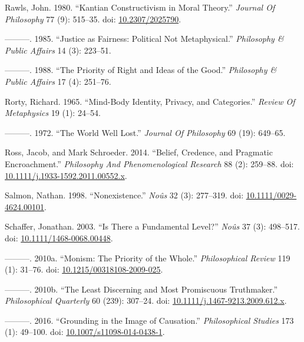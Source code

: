 \documentclass[
  10pt,
  letterpaper,
  DIV=11,
  numbers=noendperiod,
  twoside]{scrartcl}
\newlength{\cslhangindent}
\newenvironment{CSLReferences}[2] %
 {\begin{list}{}{%
  \setlength{\itemindent}{0pt}
  \setlength{\leftmargin}{0pt}
  \setlength{\parsep}{0pt}
  \ifodd #1
   \setlength{\leftmargin}{\cslhangindent}
   \setlength{\itemindent}{-1\cslhangindent}
  \fi
  \setlength{\itemsep}{#2\baselineskip}}}
 {\end{list}}
\begin{document}
\begin{CSLReferences}{1}{0}
Rawls, John. 1980. {``Kantian Constructivism in Moral Theory.''}
\emph{Journal Of Philosophy} 77 (9): 515--35. doi:
\href{https://doi.org/10.2307/2025790}{10.2307/2025790}.

---------. 1985. {``Justice as Fairness: Political Not Metaphysical.''}
\emph{Philosophy \& Public Affairs} 14 (3): 223--51.

---------. 1988. {``The Priority of Right and Ideas of the Good.''}
\emph{Philosophy \& Public Affairs} 17 (4): 251--76.

Rorty, Richard. 1965. {``Mind-Body Identity, Privacy, and Categories.''}
\emph{Review Of Metaphysics} 19 (1): 24--54.

---------. 1972. {``The World Well Lost.''} \emph{Journal Of Philosophy}
69 (19): 649--65.

Ross, Jacob, and Mark Schroeder. 2014. {``Belief, Credence, and
Pragmatic Encroachment.''} \emph{Philosophy And Phenomenological
Research} 88 (2): 259--88. doi:
\href{https://doi.org/10.1111/j.1933-1592.2011.00552.x}{10.1111/j.1933-1592.2011.00552.x}.

Salmon, Nathan. 1998. {``Nonexistence.''} \emph{Noûs} 32 (3): 277--319.
doi:
\href{https://doi.org/10.1111/0029-4624.00101}{10.1111/0029-4624.00101}.

Schaffer, Jonathan. 2003. {``Is There a Fundamental Level?''}
\emph{Noûs} 37 (3): 498--517. doi:
\href{https://doi.org/10.1111/1468-0068.00448}{10.1111/1468-0068.00448}.

---------. 2010a. {``Monism: The Priority of the Whole.''}
\emph{Philosophical Review} 119 (1): 31--76. doi:
\href{https://doi.org/10.1215/00318108-2009-025}{10.1215/00318108-2009-025}.

---------. 2010b. {``The Least Discerning and Most Promiscuous
Truthmaker.''} \emph{Philosophical Quarterly} 60 (239): 307--24. doi:
\href{https://doi.org/10.1111/j.1467-9213.2009.612.x}{10.1111/j.1467-9213.2009.612.x}.

---------. 2016. {``Grounding in the Image of Causation.''}
\emph{Philosophical Studies} 173 (1): 49--100. doi:
\href{https://doi.org/10.1007/s11098-014-0438-1}{10.1007/s11098-014-0438-1}.


\end{CSLReferences}
\end{document}
